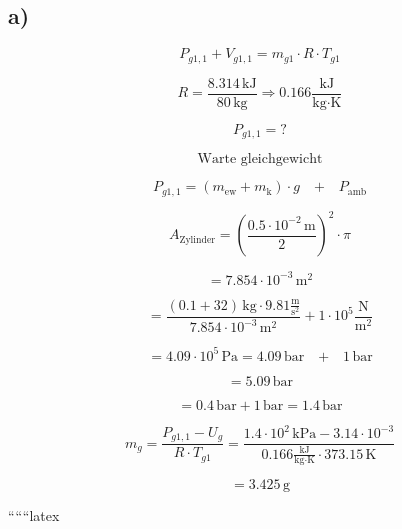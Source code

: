 

\subsection*{a)}

\[
P_{g1,1} + V_{g1,1} = m_{g1} \cdot R \cdot T_{g1}
\]

\[
R = \frac{8.314 \, \text{kJ}}{80 \, \text{kg}} \Rightarrow 0.166 \frac{\text{kJ}}{\text{kg} \cdot \text{K}}
\]

\[
P_{g1,1} = ?
\]

\[
\text{Warte gleichgewicht}
\]

\[
P_{g1,1} = (m_{\text{ew}} + m_{\text{k}}) \cdot g \quad \text{+} \quad P_{\text{amb}}
\]

\[
A_{\text{Zylinder}} = (\frac{0.5 \cdot 10^{-2} \, \text{m}}{2})^2 \cdot \pi
\]

\[
= 7.854 \cdot 10^{-3} \, \text{m}^2
\]

\[
= \frac{(0.1 + 32) \, \text{kg} \cdot 9.81 \frac{\text{m}}{\text{s}^2}}{7.854 \cdot 10^{-3} \, \text{m}^2} + 1 \cdot 10^5 \frac{\text{N}}{\text{m}^2}
\]

\[
= 4.09 \cdot 10^5 \, \text{Pa} = 4.09 \, \text{bar} \quad \text{+} \quad 1 \, \text{bar}
\]

\[
= 5.09 \, \text{bar}
\]

\[
= 0.4 \, \text{bar} + 1 \, \text{bar} = 1.4 \, \text{bar}
\]

\[
m_{g} = \frac{P_{g1,1} - U_{g}}{R \cdot T_{g1}} = \frac{1.4 \cdot 10^2 \, \text{kPa} - 3.14 \cdot 10^{-3}}{0.166 \frac{\text{kJ}}{\text{kg} \cdot \text{K}} \cdot 373.15 \, \text{K}}
\]

\[
= 3.425 \, \text{g}
\]

``````latex